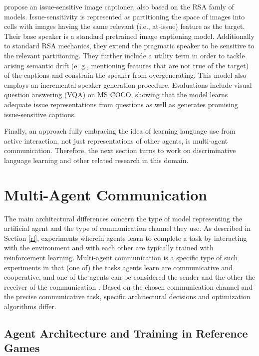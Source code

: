 \cite{nie2020pragmatic} propose an issue-sensitive image captioner, also based on the RSA famly of models. Issue-sensitivity is represented as partitioning  the space of images into cells with images having the same relevant (i.e., at-issue) feature as the target. Their base speaker is a standard  pretrained image captioning model. Additionally to standard RSA mechanics, they extend the pragmatic speaker to be sensitive to the relevant partitioning. They further include a utility term in order to tackle arising semantic drift (e. g., mentioning features that are not true of the target) of the captions and constrain the speaker from overgenerating. This model also employs an incremental speaker generation procedure. Evaluations include visual question answering (VQA) on MS COCO, showing that the model learns adequate issue representations from questions as well as generates promising issue-sensitive captions. 

Finally, an approach fully embracing the idea of learning language use from active interaction, not just representations of other agents,  is multi-agent communication. Therefore, the next section turns to work on discriminative language learning and other related research in this domain.

\section{Multi-Agent Communication}
\label{mac}
The main architectural differences concern the type of model representing the artificial agent and the type of communication channel they use.
As described in Section \ref{rl}, experiments wherein agents learn to complete a task by interacting with the environment and with each other are typically trained with reinforcement learning. Multi-agent communication is a specific type of such experiments in that (one of) the tasks agents learn are communicative and cooperative, and one of the agents can be considered the sender and the other the receiver of the communication \parencite[cf.][]{tan1993multi, lazaridou2016multi}.
Based on the chosen communication channel and the precise communicative task, specific architectural decisions and optimization algorithms differ. 

\subsection{Agent Architecture and Training in Reference Games}
\label{multi_agent_arch}

